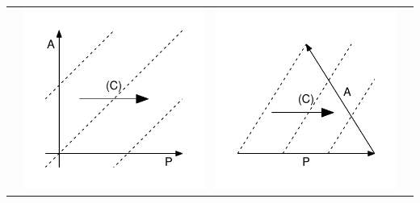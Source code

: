 \documentclass[11pt,oneside,a4paper]{article} %
\begin{document}
\begin{center}
\begin{longtable}{m{}m{}m{}m{}}
  & \includegraphics[width = \linewidth]{Figures/JonasTable/APc.pdf} & \includegraphics[width = \linewidth]{Figures/JonasTable/APc_iso.pdf}  \\

\end{longtable}
\end{center}
\end{document}
